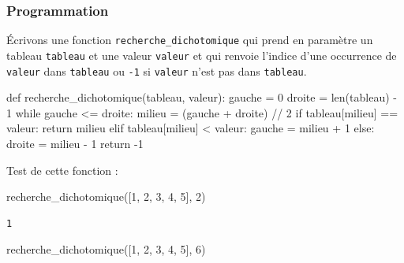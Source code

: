 \documentclass[
  a4paper,
  DIV=11,
  numbers=noendperiod]{scrartcl}
\newenvironment{Shaded}{\begin{snugshade}}{\end{snugshade}}
\newcommand{\BuiltInTok}[1]{\textcolor[rgb]{0.00,0.23,0.31}{#1}}
\newcommand{\ControlFlowTok}[1]{\textcolor[rgb]{0.00,0.23,0.31}{#1}}
\newcommand{\DecValTok}[1]{\textcolor[rgb]{0.68,0.00,0.00}{#1}}
\newcommand{\KeywordTok}[1]{\textcolor[rgb]{0.00,0.23,0.31}{#1}}
\newcommand{\NormalTok}[1]{\textcolor[rgb]{0.00,0.23,0.31}{#1}}
\newcommand{\OperatorTok}[1]{\textcolor[rgb]{0.37,0.37,0.37}{#1}}
\begin{document}
\hypertarget{programmation}{%
\subsubsection{Programmation}\label{programmation}}

Écrivons une fonction \texttt{recherche\_dichotomique} qui prend en
paramètre un tableau \texttt{tableau} et une valeur \texttt{valeur} et
qui renvoie l'indice d'une occurrence de \texttt{valeur} dans
\texttt{tableau} ou \texttt{-1} si \texttt{valeur} n'est pas dans
\texttt{tableau}.

\begin{Shaded}
\begin{Highlighting}[]
\KeywordTok{def}\NormalTok{ recherche\_dichotomique(tableau, valeur):}
\NormalTok{    gauche }\OperatorTok{=} \DecValTok{0}
\NormalTok{    droite }\OperatorTok{=} \BuiltInTok{len}\NormalTok{(tableau) }\OperatorTok{{-}} \DecValTok{1}
    \ControlFlowTok{while}\NormalTok{ gauche }\OperatorTok{\textless{}=}\NormalTok{ droite:}
\NormalTok{        milieu }\OperatorTok{=}\NormalTok{ (gauche }\OperatorTok{+}\NormalTok{ droite) }\OperatorTok{//} \DecValTok{2}
        \ControlFlowTok{if}\NormalTok{ tableau[milieu] }\OperatorTok{==}\NormalTok{ valeur:}
            \ControlFlowTok{return}\NormalTok{ milieu}
        \ControlFlowTok{elif}\NormalTok{ tableau[milieu] }\OperatorTok{\textless{}}\NormalTok{ valeur:}
\NormalTok{            gauche }\OperatorTok{=}\NormalTok{ milieu }\OperatorTok{+} \DecValTok{1}
        \ControlFlowTok{else}\NormalTok{:}
\NormalTok{            droite }\OperatorTok{=}\NormalTok{ milieu }\OperatorTok{{-}} \DecValTok{1}
    \ControlFlowTok{return} \OperatorTok{{-}}\DecValTok{1}
\end{Highlighting}
\end{Shaded}

Test de cette fonction :

\begin{Shaded}
\begin{Highlighting}[]
\NormalTok{recherche\_dichotomique([}\DecValTok{1}\NormalTok{, }\DecValTok{2}\NormalTok{, }\DecValTok{3}\NormalTok{, }\DecValTok{4}\NormalTok{, }\DecValTok{5}\NormalTok{], }\DecValTok{2}\NormalTok{)}
\end{Highlighting}
\end{Shaded}

\begin{verbatim}
1
\end{verbatim}

\begin{Shaded}
\begin{Highlighting}[]
\NormalTok{recherche\_dichotomique([}\DecValTok{1}\NormalTok{, }\DecValTok{2}\NormalTok{, }\DecValTok{3}\NormalTok{, }\DecValTok{4}\NormalTok{, }\DecValTok{5}\NormalTok{], }\DecValTok{6}\NormalTok{)}
\end{Highlighting}
\end{Shaded}
\end{document}
